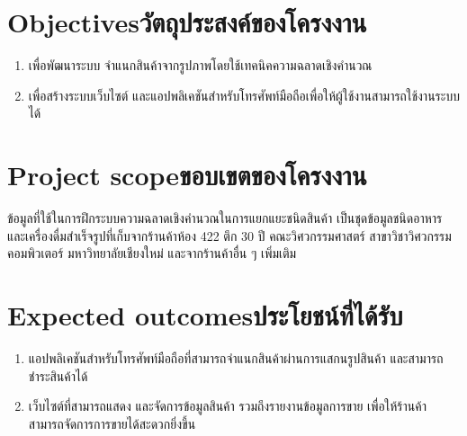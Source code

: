 \section{\ifenglish Objectives\else วัตถุประสงค์ของโครงงาน\fi}
\begin{enumerate}
    \item เพื่อพัฒนาระบบ จำแนกสินค้าจากรูปภาพโดยใช้เทคนิคความฉลาดเชิงคำนวณ
    \item เพื่อสร้างระบบเว็บไซต์ และแอปพลิเคชันสำหรับโทรศัพท์มือถือเพื่อให้ผู้ใช้งานสามารถใช้งานระบบได้
\end{enumerate}

\section{\ifenglish Project scope\else ขอบเขตของโครงงาน\fi}
ข้อมูลที่ใช้ในการฝึกระบบความฉลาดเชิงคำนวณในการแยกแยะชนิดสินค้า
เป็นชุดข้อมูลชนิดอาหาร และเครื่องดื่มสำเร็จรูปที่เก็บจากร้านค้าห้อง 422 ตึก 30 ปี คณะวิศวกรรมศาสตร์ สาขาวิชาวิศวกรรมคอมพิวเตอร์ มหาวิทยาลัยเชียงใหม่
และจากร้านค้าอื่น ๆ เพิ่มเติม


\section{\ifenglish Expected outcomes\else ประโยชน์ที่ได้รับ\fi}
\begin{enumerate}
    \item แอปพลิเคชันสำหรับโทรศัพท์มือถือที่สามารถจำแนกสินค้าผ่านการแสกนรูปสินค้า และสามารถชำระสินค้าได้
    \item เว็บไซต์ที่สามารถแสดง และจัดการข้อมูลสินค้า รวมถึงรายงานข้อมูลการขาย เพื่อให้ร้านค้าสามารถจัดการการขายได้สะดวกยิ่งขึ้น
\end{enumerate}
